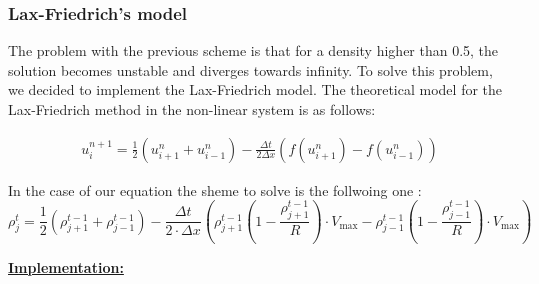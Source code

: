 \documentclass{article}
\begin{document}
		\subsubsection{Lax-Friedrich's model}
		
		The problem with the previous scheme is that for a density higher than 0.5, the solution becomes unstable and diverges towards infinity. To solve this problem, we decided to implement the Lax-Friedrich model. The theoretical model for the Lax-Friedrich method in the non-linear system is as follows:
		
		\begin{align}
			\boxed{u_{i}^{n+1} = \frac{1}{2}(u_{i+1}^{n} + u_{i-1}^{n}) - \frac{\Delta t}{2\Delta x}(f(u_{i+1}^{n}) - f(u_{i-1}^{n}))}
		\end{align}
		
		In the case of our equation the sheme to solve is the follwoing one : 
		\begin{equation}
			\boxed{
				\rho_{j}^t = \frac{1}{2} \left(\rho_{j+1}^{t-1} + \rho_{j-1}^{t-1}\right) - \frac{\Delta t}{2 \cdot \Delta x} \left( \rho_{j+1}^{t-1} \left(1 - \frac{\rho_{j+1}^{t-1}}{R}\right) \cdot V_{\text{max}} - \rho_{j-1}^{t-1} \left(1 - \frac{\rho_{j-1}^{t-1}}{R}\right) \cdot V_{\text{max}} \right)
			}
		\end{equation} \newpage
	
		
		\textbf{\underline{Implementation:}} \newline\newline
		
\end{document}

